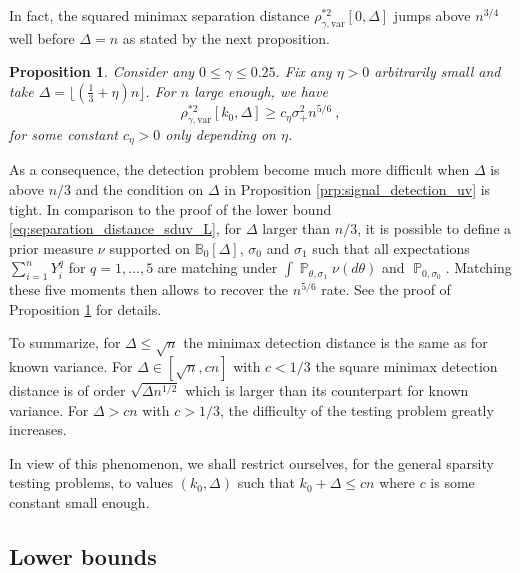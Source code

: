 \documentclass[twoside,11pt]{article}
\newtheorem{prp}{Proposition}
\def\bbB{\mathbb{B}}
\renewcommand{\P}{\operatorname{\mathbb{P}}}
\newcommand{\<}{\langle}
\renewcommand{\>}{\rangle}
\begin{document}
In fact, the squared minimax separation distance  $\rho_{\gamma,\mathrm{var}}^{*2}[0,\Delta]$ jumps above $n^{3/4}$ well before $\Delta=n$ as stated by the next proposition.
\begin{prp}\label{prp:n_div_3}
Consider any $0\leq \gamma\leq 0.25$. 
Fix any $\eta>0$ arbitrarily small and take  $\Delta=  \lfloor (\frac{1}{3}+ \eta)n \rfloor$. For $n$ large enough, we have 
\[
\rho_{\gamma,\mathrm{var}}^{*2}[k_0,\Delta] \geq c_{\eta} \sigma_+^2 n^{5/6}\ , 
\]
for some constant $c_\eta>0$ only depending on $\eta$. 
\end{prp}
As a consequence, the detection problem become much more difficult when $\Delta$ is above $n/3$ and the condition on $\Delta$ in Proposition \ref{prp:signal_detection_uv} is  tight. In comparison to the proof of the lower bound \eqref{eq:separation_distance_sduv_L}, for $\Delta$ larger than $n/3$, it is possible to define a prior measure $\nu$ supported on $\bbB_0[\Delta]$, $\sigma_0$ and $\sigma_1$ such that all expectations $\sum_{i=1}^n Y^q_i$ for $q=1,\ldots,5$ are matching under $\int \P_{\theta,\sigma_1}\nu(d \theta)$ and $\P_{0,\sigma_0}$. Matching these five moments then allows to recover the  $n^{5/6}$ rate. See the proof of Proposition \ref{prp:n_div_3} for details. 



To summarize, for $\Delta\leq \sqrt{n}$ the minimax detection distance is the same as for known variance. For $\Delta\in [\sqrt{n}, cn]$ with $c<1/3$ the square minimax detection distance is of order $\sqrt{\Delta n^{1/2}}$ which is larger than its counterpart for known variance.  For $\Delta > cn$ with $c>1/3$, the difficulty of the testing problem greatly increases. 


In view of this phenomenon, we shall restrict ourselves, for the general sparsity testing problems, to values  $(k_0,\Delta)$ such that $k_0+\Delta\leq cn$ where $c$ is some constant small enough. 






\subsection{Lower bounds}\label{sec:lbuv}
\end{document}
